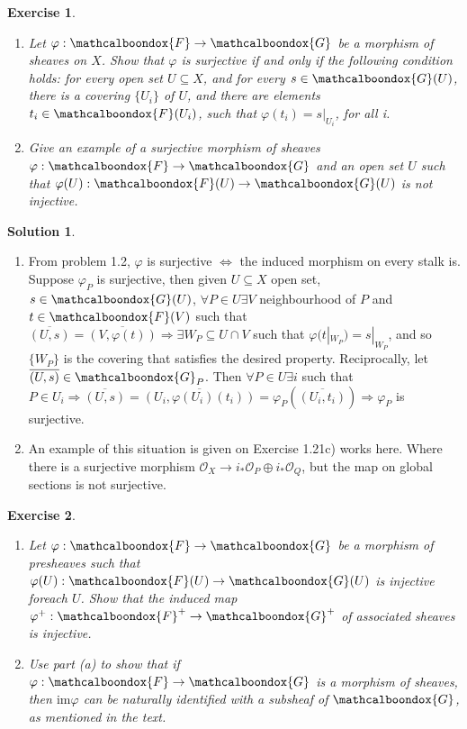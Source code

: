 \documentclass[12pt]{article}
\newcommand{\imp}{\ensuremath{\Rightarrow}}
\newcommand{\ima}{\ensuremath{\mathrm{im}}}
\newcommand{\locO}{\ensuremath{\mathcal{O}}}
\newtheorem{ex}{Exercise}[section]
\theoremstyle{definition}
\newtheorem*{sol}{Solution}
\newcommand{\sF}{\ensuremath{\mathcalboondox{F}}}
\newcommand{\sG}{\ensuremath{\mathcalboondox{G}}}
\begin{document}
\begin{ex}
	\begin{enumerate}[label=\alph*)]
		\item Let $\varphi: \sF \to \sG$ be a morphism of sheaves on $X$. Show that $\varphi$ is surjective if and only if the following condition holds: for every open set $U \subseteq X$, and for every $s \in \sG(U)$, there is a covering $\{U_i\}$ of $U$, and there are elements $t_i \in \sF(U_i)$, such that $\varphi(t_i) = s|_{U_i}$, for all i.

		\item Give an example of a surjective morphism of sheaves $\varphi: \sF \to \sG$ and an open set $U$ such that $\varphi(U): \sF(U) \to \sG(U)$ is not injective.
	\end{enumerate}
\end{ex}

\begin{sol}
	\begin{enumerate}[label=\alph*)]
		\item From problem 1.2, $\varphi$ is surjective $\iff$ the induced morphism on every stalk is. Suppose $\varphi_P$ is surjective, then given $U \subseteq X$ open set, $s \in \sG(U)$, $\forall P \in U \exists V$ neighbourhood of $P$ and $t \in \sF(V)$ such that $\overline{(U,s)} = \overline{(V,\varphi(t))} \imp \exists W_P \subseteq U \cap V$ such that $\varphi(t|_{W_P}) = s|_{W_P}$, and so $\{W_P\}$ is the covering that satisfies the desired property. Reciprocally, let $\overline{(U,s)} \in \sG_P$. Then $\forall P \in U \exists i$ such that $P \in U_i \imp \overline{(U,s)} = \overline{(U_i, \varphi(U_i)(t_i))} = \varphi_P(\overline{(U_i, t_i)}) \imp \varphi_P$ is surjective.

		\item An example of this situation is given on Exercise 1.21c) works here. Where there is a surjective morphism $\locO_X \to i_*\locO_P \oplus i_* \locO_Q$, but the map on global sections is not surjective.
	\end{enumerate}
\end{sol}

\begin{ex}
	\begin{enumerate}[label=\alph*)]
		\item Let $\varphi: \sF \to \sG$ be a morphism of presheaves such that $\varphi(U): \sF(U) \to \sG(U)$ is injective foreach $U$. Show that the induced map $\varphi^{+}: \sF^{+} \to \sG^{+}$ of associated sheaves is injective.

		\item Use part (a) to show that if $\varphi: \sF \to \sG$ is a morphism of sheaves, then $\ima \varphi$ can be naturally identified with a subsheaf of $\sG$, as mentioned in the text.
	\end{enumerate}
\end{ex}
\end{document}
